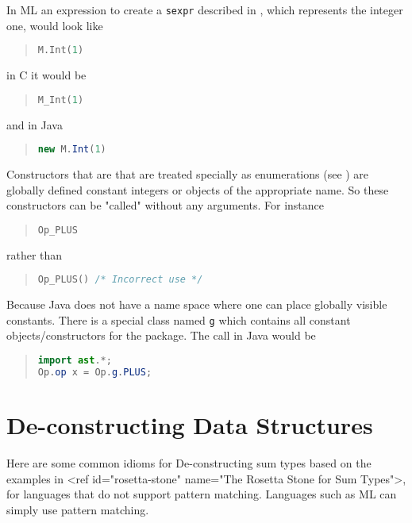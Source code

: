 In ML an expression to create a \lstinline!sexpr! described in
, which represents the integer one, would look like
\begin{quote}\begin{lstlisting}[language=SML]
M.Int(1)       
\end{lstlisting}\end{quote}%
in C it would be
\begin{quote}\begin{lstlisting}[language=c]  
M_Int(1)
\end{lstlisting}\end{quote}%
and in Java
\begin{quote}\begin{lstlisting}[language=java]
new M.Int(1)
\end{lstlisting}\end{quote}%

Constructors that are that are treated specially as
enumerations (see ) 
are globally defined constant integers or objects of the appropriate name. So
these constructors can be "called" without any arguments. For instance
\begin{quote}\begin{lstlisting}[language=c]
Op_PLUS
\end{lstlisting}\end{quote}%
rather than
\begin{quote}\begin{lstlisting}[language=c]
Op_PLUS() /* Incorrect use */
\end{lstlisting}\end{quote}%

Because Java does not have a name space where one can place
globally visible constants. There is a special class named \lstinline!g! which
contains all constant objects/constructors for the package. The call in Java
would be 
\begin{quote}\begin{lstlisting}[language=java]
import ast.*;
Op.op x = Op.g.PLUS;
\end{lstlisting}\end{quote}%

\section{De-constructing Data Structures}
Here are some common idioms for De-constructing sum types based on the 
examples in <ref id="rosetta-stone" name="The Rosetta Stone for Sum 
Types">, for languages that do not support pattern matching. Languages such
as ML can simply use pattern matching.

